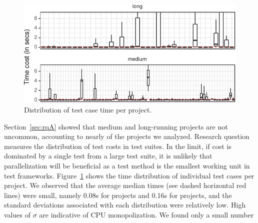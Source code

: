 \begin{figure}[t!]
  \centering
  \includegraphics[width=.48\textwidth]{results/testcost-distribution.pdf}
  \caption{\label{fig:time-distributions}Distribution of test case time per project.}%
  \vspace{-3ex}
\end{figure}

Section~\ref{sec:rqA} showed that medium and long-running projects are
not uncommon, accounting to nearly \percentMedLongRunning{} of the
\numSubjs{} projects we analyzed.  Research question \numRQFeasibilityTwo{}
measures the distribution of test costs in test suites.  In
the limit, if cost is dominated by a single test from a large test
suite, it is unlikely that parallelization will be beneficial as a
test method is the smallest working unit in test frameworks.
Figure~\ref{fig:time-distributions} shows the time distribution of
individual test cases per project.
We observed that the average median times (see dashed horizontal red
lines) were small, namely 0.08s
for \medg{} projects and 0.16s for \longg{} projects, and the standard deviations associated with each distribution were
relatively low. High values of
$\sigma$ are indicative of CPU monopolization. We found only a small number
